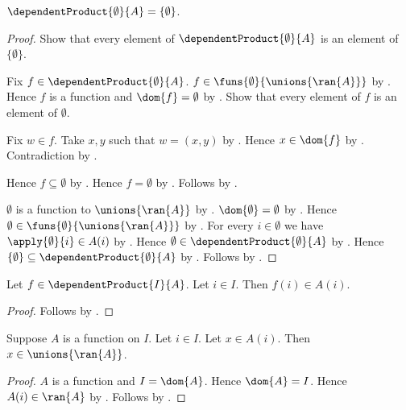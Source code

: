 \begin{proposition}\label{empty_dependent_product}
    $\dependentProduct{\emptyset}{A}=\{\emptyset\}$.
\end{proposition}
\begin{proof}
    Show that every element of $\dependentProduct{\emptyset}{A}$ is an
        element of $\{\emptyset\}$.
    \begin{subproof}
        Fix $f\in\dependentProduct{\emptyset}{A}$.
        $f\in\funs{\emptyset}{\unions{\ran{A}}}$ by
            .
        Hence $f$ is a function and $\dom{f}=\emptyset$ by
            .
        Show that every element of $f$ is an element of $\emptyset$.
        \begin{subproof}
            Fix $w\in f$.
            Take $x,y$ such that $w=(x,y)$ by .
            Hence $x\in\dom{f}$ by .
            Contradiction by .
        \end{subproof}
        Hence $f\subseteq\emptyset$ by .
        Hence $f=\emptyset$ by .
        Follows by .
    \end{subproof}

    $\emptyset$ is a function to $\unions{\ran{A}}$ by
        .
    $\dom{\emptyset}=\emptyset$ by .
    Hence $\emptyset\in\funs{\emptyset}{\unions{\ran{A}}}$ by
        .
    For every $i\in\emptyset$ we have $\apply{\emptyset}{i}\in A(i)$ by
        .
    Hence $\emptyset\in\dependentProduct{\emptyset}{A}$ by
        .
    Hence $\{\emptyset\}\subseteq\dependentProduct{\emptyset}{A}$ by
        .
    Follows by .
\end{proof}

\begin{proposition}\label{dependent_product_coordinate}
    Let $f\in\dependentProduct{I}{A}$.
    Let $i\in I$.
    Then $f(i)\in A(i)$.
\end{proposition}
\begin{proof}
    Follows by .
\end{proof}

\begin{proposition}\label{indexed_family_member_union}
    Suppose $A$ is a function on $I$.
    Let $i\in I$.
    Let $x\in A(i)$.
    Then $x\in\unions{\ran{A}}$.
\end{proposition}
\begin{proof}
    $A$ is a function and $I=\dom{A}$.
    Hence $\dom{A}=I$.
    Hence $A(i)\in\ran{A}$ by .
    Follows by .
\end{proof}

